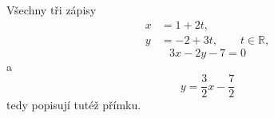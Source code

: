 \begin{example}
    Všechny tři zápisy
    \[
        \begin{aligned}
            x&=1+2t,\\
            y&=-2+3t,
            \qquad t\in\mathbb{R},
        \end{aligned}
    \]
    \[
        3x-2y-7=0
    \]
    a
    \[
        y=\frac{3}{2}x-\frac{7}{2}
    \]
    tedy popisují tutéž přímku.
\end{example}
